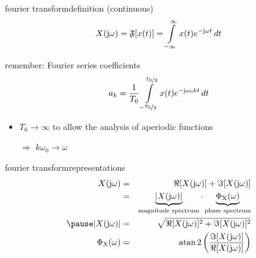         \begin{frame}{fourier transform}{definition (continuous)}
            \begin {equation*}\label{eq:fourier_transformation}
                X(\mathrm{j}\omega) = \mathfrak{F}[x(t)] = \int\limits_{-\infty}^{\infty} {x(t) {e}^{-\mathrm{j}\omega t}\, dt}
            \end {equation*}

            \pause
            remember: Fourier series coefficients 
            \begin {equation*}\label{eq:fourier_coeff}
                a_k = \frac{1}{T_0}\int\limits_{-\nicefrac{T_0}{2}}^{\nicefrac{T_0}{2}} x(t) {e}^{-\mathrm{j}\omega_0kt}\, dt \nonumber
            \end {equation*}
            
            \begin{itemize}
                \item	$T_0\rightarrow \infty$ to allow the analysis of aperiodic functions
                \item[$\Rightarrow$] $k\omega_0 \rightarrow \omega$
            \end{itemize}
        \end{frame}	

        \begin{frame}{fourier transform}{representations}
            \begin{eqnarray*}
                X(\jom) &=& \Re[X(\jom)] + \Im[X(\jom)]\\
                &=& \underbrace{|X(\jom)|}_{\text{magnitude spectrum}} \cdot \underbrace{\Phi_\mathrm{X}(\omega)}_{\text{phase spectrum}}\\
                \pause
                \bigskip
                |X(\jom)|  &=& \sqrt{\Re[X(\jom)]^2 + \Im[X(\jom)]^2}\\
                \Phi_\mathrm{X}(\omega)  &=& \atan2\left(\frac{\Im[X(\jom)]}{\Re[X(\jom)]}\right)
            \end{eqnarray*}
        \end{frame}	

